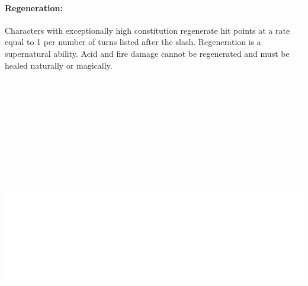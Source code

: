 \begin{multicols}{2}
\paragraph{Regeneration:}  Characters with exceptionally high constitution regenerate hit points at a rate equal to 1 per number of turns listed after the slash.  Regeneration is a supernatural ability.  Acid and fire damage cannot be regenerated and must be healed naturally or magically. 

\noindent\includegraphics[width=\columnwidth, height=5.5in]{testblock.pdf}  

\end{multicols}


